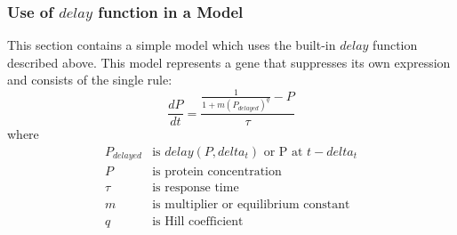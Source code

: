 \documentclass[10pt]{cekarticle}
\begin{document}
\subsubsection{Use of $delay$ function in a Model}
\label{sec:delayeg}
This section contains a simple model which uses the built-in $delay$ function described above.  This model represents a gene that suppresses its own expression and consists of the single rule:
\begin{equation*}
\frac{d P}{d t} = \frac{ \frac{1}{1 + m (P_{delayed})^q} - P }{ \tau }
\end{equation*}
where
\begin{equation*}
\begin{array}{rl}
P_{delayed} & \mbox{is } delay(P, delta_t) \mbox{ or P at } t - delta_t\\
P & \mbox{is protein concentration}\\
\tau & \mbox{is response time}\\
m & \mbox{is multiplier or equilibrium constant}\\
q & \mbox{is Hill coefficient}\\ 
\end{array}
\end{equation*}
\end{document}
